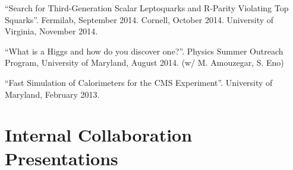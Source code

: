 \begin{description}[leftmargin=12pt,font=\normalfont,labelsep=0em]
\item ``Search for Third-Generation Scalar Leptoquarks and R-Parity Violating Top Squarks''. Fermilab, September 2014. Cornell, October 2014. University of Virginia, November 2014.
\item ``What is a Higgs and how do you discover one?''. Physics Summer Outreach Program, University of Maryland, August 2014. (w/ M. Amouzegar, S. Eno)
\item ``Fast Simulation of Calorimeters for the CMS Experiment''. University of Maryland, February 2013.
\end{description}

\ifdefined\longflag
\section{Internal Collaboration Presentations}
